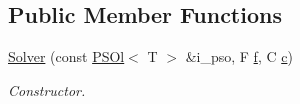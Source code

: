 \subsection*{Public Member Functions}
\begin{DoxyCompactItemize}
\item 
\hyperlink{classea_1_1_solver_3_01_p_s_ol_00_01_t_00_01_f_00_01_c_01_4_aa27c4e1663fa5d0400cd75191e695f40}{Solver} (const \hyperlink{structea_1_1_p_s_ol}{P\+S\+Ol}$<$ T $>$ \&i\+\_\+pso, F \hyperlink{classea_1_1_solver__base_ae0a893780c93dfe17c1d17301de6494f}{f}, C \hyperlink{classea_1_1_solver__base_a6914e89d30e7484f2b4af1783f0de8c3}{c})
\begin{DoxyCompactList}\small\item\em Constructor. \end{DoxyCompactList}\end{DoxyCompactItemize}
